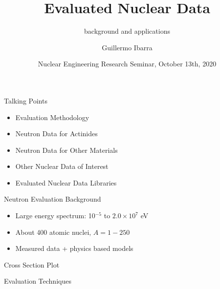 \documentclass[sans,mathserif,aspectratio=169, 10pt]{beamer}
\title{Evaluated Nuclear  Data}
\subtitle{background and applications}
\author[Guillermo Ibarra]{Guillermo Ibarra}
\date{Nuclear Engineering Research Seminar, October 13th, 2020}
\begin{document}
\begin{frame}
\titlepage
\end{frame}

\begin{frame}{Talking Points}
\begin{itemize}
	\item<1> Evaluation Methodology
	\item<2> Neutron Data for Actinides
	\item<3> Neutron Data for Other Materials
	\item<5> Other Nuclear Data of Interest
	\item<6> Evaluated Nuclear Data Libraries
\end{itemize}
\end{frame}

\begin{frame}{Neutron Evaluation Background}
\begin{itemize}
	\item<1> Large energy spectrum: 10$^{-5}$ to $2.0 \times 10^{7}$ eV
	\item<2> About 400 atomic nuclei, $A=1-250$
	\item<3> Measured data + physics based models
\end{itemize}
\end{frame}

\begin{frame}{Cross Section Plot}
  \centering
\end{frame}


\begin{frame}{Evaluation Techniques}
	\centering
\end{frame}
\end{document}
